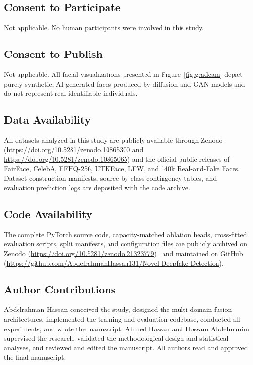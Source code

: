 \documentclass[fleqn,10pt]{wlscirep}
\begin{document}
\subsection*{Consent to Participate}
Not applicable. No human participants were involved in this study.

\subsection*{Consent to Publish}
Not applicable. All facial visualizations presented in Figure~\ref{fig:gradcam} depict purely synthetic, AI-generated faces produced by diffusion and GAN models and do not represent real identifiable individuals.

\subsection*{Data Availability}
All datasets analyzed in this study are publicly available through Zenodo (\url{https://doi.org/10.5281/zenodo.10865300} and \url{https://doi.org/10.5281/zenodo.10865065}) and the official public releases of FairFace, CelebA, FFHQ-256, UTKFace, LFW, and 140k Real-and-Fake Faces. Dataset construction manifests, source-by-class contingency tables, and evaluation prediction logs are deposited with the code archive.

\subsection*{Code Availability}
The complete PyTorch source code, capacity-matched ablation heads, cross-fitted evaluation scripts, split manifests, and configuration files are publicly archived on Zenodo (\url{https://doi.org/10.5281/zenodo.21323779})~\cite{ref26} and maintained on GitHub (\url{https://github.com/AbdelrahmanHassan131/Novel-Deepfake-Detection}).

\subsection*{Author Contributions}
Abdelrahman Hassan conceived the study, designed the multi-domain fusion architectures, implemented the training and evaluation codebase, conducted all experiments, and wrote the manuscript. Ahmed Hassan and Hossam Abdelmunim supervised the research, validated the methodological design and statistical analyses, and reviewed and edited the manuscript. All authors read and approved the final manuscript.
\end{document}
